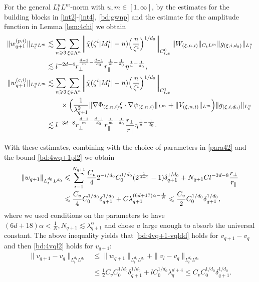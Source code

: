 \documentclass[10pt,a4paper]{amsart}
\numberwithin{equation}{section}
\def\({{\Big(}}
\def\){{\Big)}}
\newcommand{\norm}[1]{\left\|#1\right\|}
\def\geq{\geqslant}
\def\leq{\leqslant}
\def\({{\Big(}}
\def\){{\Big)}}
\def\geq{\geqslant}
\def\leq{\leqslant}
\begin{document}
For the general $L^u_tL^m$-norm with $u,m\in[1,\infty]$, by the estimates for the building blocks in \eqref{int2}-\eqref{int4}, \eqref{bd:gwnp}
and the estimate for the amplitude function in  Lemma \ref{lem:4chi} we obtain
\begin{align}
\|w_{q+1}^{(p,i)}\|_{L^u_tL^m}&\lesssim\sum_{n\geq3}\sum_{\xi\in\Lambda^{n}}\norm{\tilde{\chi}(\zeta^{i}|M^{i}_l|-n)\(\frac{n}{\zeta^{i}}\)^{1/d_0}}_{C_{t,x}^0}\|W_{(\xi,n,i)}\|_{C_tL^m}\|g_{(\xi,i,d_0)}\|_{L_t^u}\notag\\
&\lesssim l^{-2d-4}r_\perp^{\frac{d-1}{m}-\frac{d-1}{d_0}} r_\parallel^{\frac{1}{m}-\frac{1}{d_0}}\eta^{\frac1u-\frac1{d_0}},\label{bd:4wq+1plp}\\
\|w_{q+1}^{(c,i)}\|_{L^u_tL^m}&\lesssim\sum_{n\geq3}\sum_{\xi\in\Lambda^{n}}\norm{\tilde{\chi}(\zeta^{i}|M^{i}_l|-n)\(\frac{n}{\zeta^{i}}\)^{1/d_0}}_{C^1_{t,x}}\notag\\ 
&\quad\quad \times\(\frac{1}{\lambda_{q+1}^2}\|\nabla\Phi_{(\xi,n,i)} \xi\cdot\nabla\psi_{(\xi,n,i)} \|_{L^m}+\|V_{(\xi,n,i)}\|_{L^m}\)\|g_{(\xi,i,d_0)}\|_{L_t^u}\notag\\
&\lesssim l^{-3d-8}r_\perp^{\frac{d-1}{m}-\frac{d-1}{d_0}} r_\parallel^{\frac{1}{m}-\frac{1}{d_0}}\frac{r_\perp}{ r_\parallel}\eta^{\frac1u-\frac1{d_0}}.\label{bd:4wq+1clp}
\end{align}

With these estimates, combining with the choice of parameters in  \eqref{para42} and the bound \eqref{bd:4wq+1pl2} we obtain 
\begin{align}
\|w_{q+1}\|_{L^{d_0}_tL^{d_0}}&\leq \sum_{i=1}^{N_{q+1}}\frac{C_v}42^{-i/d_0}C_0^{1/d_0}(2^{\frac1{d+1}}-1)\delta_{q+1}^{1/d_0}+N_{q+1}Cl^{-3d-8}\frac{r_\perp}{ r_\parallel}\notag \\
&\leq \frac{C_v}4C_0^{1/d_0}\delta_{q+1}^{1/d_0}+C\lambda_{q+1}^{(6d+17)\alpha-\frac1N} \leq \frac{C_v}2C_0^{1/d_0}\delta_{q+1}^{1/d_0},\label{bd:4wq+1l2}\end{align}
where we used  conditions on the parameters to have
${(6d+18)\alpha<\frac{1}{N}},N_{q+1}\lesssim\lambda_{q+1}^{\alpha}$ and chose $a$ large enough to absorb the universal constant. 
The above inequality   yields that \eqref{bd:4vq+1-vqldd} holds for $v_{q+1}-v_q$ and then \eqref{bd:4vql2} holds for $v_{q+1}$:
\begin{align*}
\|v_{q+1}-v_{q}\|_{L^{d_0}_tL^{d_0}}&\leq\|w_{q+1} \|_{L^{d_0}_tL^{d_0}}+\|v_{l}-v_{q}\|_{L^{d_0}_tL^{d_0}}\\
&\leq \frac12
C_vC_0^{1/d_0}\delta_{q+1}^{1/d_0}+lC_0^{1/d_0}\lambda_q^{d+4} \leq
C_vC_0^{1/d_0}\delta_{q+1}^{1/d_0}.
\end{align*}
\end{document}
